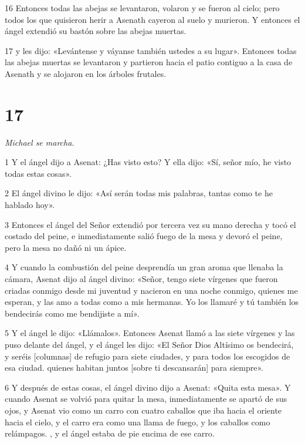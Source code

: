\par 16 Entonces todas las abejas se levantaron, volaron y se fueron al cielo; pero todos los que quisieron herir a Asenath cayeron al suelo y murieron. Y entonces el ángel extendió su bastón sobre las abejas muertas.

\par 17 y les dijo: «Levántense y váyanse también ustedes a su lugar». Entonces todas las abejas muertas se levantaron y partieron hacia el patio contiguo a la casa de Asenath y se alojaron en los árboles frutales.

\chapter{17}

\par \textit{Michael se marcha.}

\par 1 Y el ángel dijo a Asenat: ¿Has visto esto? Y ella dijo: «Sí, señor mío, he visto todas estas cosas».

\par 2 El ángel divino le dijo: «Así serán todas mis palabras, tantas como te he hablado hoy».

\par 3 Entonces el ángel del Señor extendió por tercera vez su mano derecha y tocó el costado del peine, e inmediatamente salió fuego de la mesa y devoró el peine, pero la mesa no dañó ni un ápice.

\par 4 Y cuando la combustión del peine desprendía un gran aroma que llenaba la cámara, Asenat dijo al ángel divino: «Señor, tengo siete vírgenes que fueron criadas conmigo desde mi juventud y nacieron en una noche conmigo, quienes me esperan, y las amo a todas como a mis hermanas. Yo los llamaré y tú también los bendecirás como me bendijiste a mí».

\par 5 Y el ángel le dijo: «Llámalos». Entonces Asenat llamó a las siete vírgenes y las puso delante del ángel, y el ángel les dijo: «El Señor Dios Altísimo os bendecirá, y seréis [columnas] de refugio para siete ciudades, y para todos los escogidos de esa ciudad. quienes habitan juntos [sobre ti descansarán] para siempre».

\par 6 Y después de estas cosas, el ángel divino dijo a Asenat: «Quita esta mesa». Y cuando Asenat se volvió para quitar la mesa, inmediatamente se apartó de sus ojos, y Asenat vio como un carro con cuatro caballos que iba hacia el oriente hacia el cielo, y el carro era como una llama de fuego, y los caballos como relámpagos. , y el ángel estaba de pie encima de ese carro.

